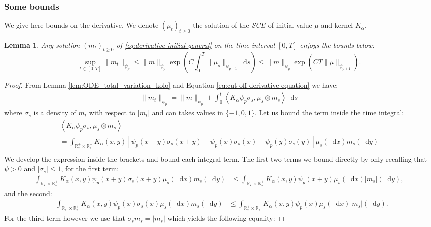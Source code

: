 \documentclass[11pt,a4paper]{article}
\newcommand{\RRP}{\mathbb{R}^+_*}
\newcommand{\SCE}{\emph{SCE}}
\newcommand{\Proc}[1]{\left(#1\right)_{t\geq 0}}
\newcommand{\brac}[1]{\left\langle#1\right\rangle}
\newcommand{\dd}{\mathop{}\!\mathrm{d}}
\newtheorem{lemma}[theorem]{Lemma}
\begin{document}
\subsubsection{Some bounds}
We give here bounds on the derivative. We denote $\Proc{\mu_t}$ the solution of the $\SCE$ of initial value $\mu$ and kernel $K_\alpha$.
\begin{lemma}\label{lem:bound_derivative}
    Any solution $\Proc{m_t}$ of \eqref{eq:derivative-initial-general} on the time interval $[0,T]$ enjoys the bounds below:
    \[ \sup\limits_{t \in [0,T]}\| m_t\|_{\psi_p} \leq \| m\|_{\psi_p} \exp{\left( C\int_0^T\| \mu_s\|_{\psi_{p+1}} \dd s \right)} \leq \| m\|_{\psi_p} \exp{\left( CT\| \mu\|_{\psi_{p+1}}\right)}.\]
\end{lemma}
\begin{proof}
    From Lemma \ref{lem:ODE_total_variation_kolo} and Equation \eqref{eq:cut-off-derivative-equation} we have:
    \begin{align*}
        \| m_t\|_{\psi_p} = \| m\|_{\psi_p} + \int_0^t \brac{K_\alpha \psi_p\sigma_s, \mu_s\otimes m_s} \dd s
    \end{align*}
    where $\sigma_s$ is a density of $m_t$ with respect to $|m_t|$ and can takes values in $\lbrace -1,0,1 \rbrace$. Let us bound the term inside the time integral:
    \begin{multline*}
        \brac{K_\alpha \psi_p\sigma_s, \mu_s\otimes m_s}\\
        = \int_{\RRP\times\RRP} K_\alpha(x,y) \left[\psi_p(x+y)\sigma_s(x+y) - \psi_p(x)\sigma_s(x) - \psi_p(y)\sigma_s(y) \right]\mu_s(\dd x)m_s(\dd y) \\
    \end{multline*}
    We develop the expression inside the brackets and bound each integral term. The first two terms we bound directly by only recalling that $\psi > 0$ and $|\sigma_s| \leq 1$, for the first term:
    \begin{align*}
        \int_{\RRP\times\RRP} K_\alpha(x,y) \psi_p(x + y)\sigma_s(x+y) \mu_s(\dd x) m_s(\dd y) &\leq \int_{\RRP\times\RRP} K_\alpha(x,y) \psi_p(x+y)\mu_s(\dd x)|m_s|(\dd y),
    \end{align*}
    and the second:
    \begin{align*}
        -\int_{\RRP\times\RRP} K_\alpha(x,y) \psi_p(x)\sigma_s(x) \mu_s(\dd x) m_s(\dd y) &\leq \int_{\RRP\times\RRP} K_\alpha(x,y) \psi_p(x)\mu_s(\dd x)|m_s|(\dd y).
    \end{align*}
    For the third term however we use that $\sigma_s m_s = |m_s|$ which yields the following equality:

\end{proof}
\end{document}
